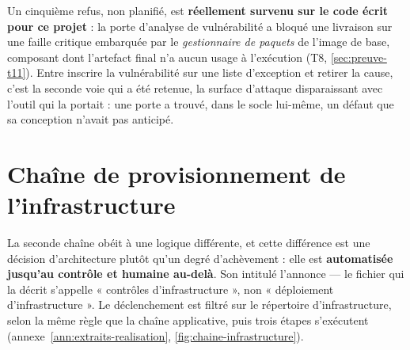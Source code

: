 Un cinquième refus, non planifié, est \textbf{réellement survenu sur le code écrit pour ce projet} :
la porte d'analyse de vulnérabilité a bloqué une livraison sur une faille critique embarquée par le
\emph{gestionnaire de paquets} de l'image de base, composant dont l'artefact final n'a aucun usage à
l'exécution (T8, \cref{sec:preuve-t11}).
Entre inscrire la vulnérabilité sur une liste d'exception et retirer la cause, c'est la seconde voie
qui a été retenue, la surface d'attaque disparaissant avec l'outil qui la portait : une porte a
trouvé, dans le socle lui-même, un défaut que sa conception n'avait pas anticipé.

\section{Chaîne de provisionnement de l'infrastructure}
\label{sec:chaine-infra}

La seconde chaîne obéit à une logique différente, et cette différence est une décision
d'architecture plutôt qu'un degré d'achèvement : elle est \textbf{automatisée jusqu'au contrôle et
humaine au-delà}. Son intitulé l'annonce --- le fichier qui la décrit s'appelle « contrôles
d'infrastructure », non « déploiement d'infrastructure ». Le déclenchement est filtré sur le
répertoire d'infrastructure, selon la même règle que la chaîne applicative, puis trois étapes
s'exécutent (annexe~\ref{ann:extraits-realisation}, \cref{fig:chaine-infrastructure}).

